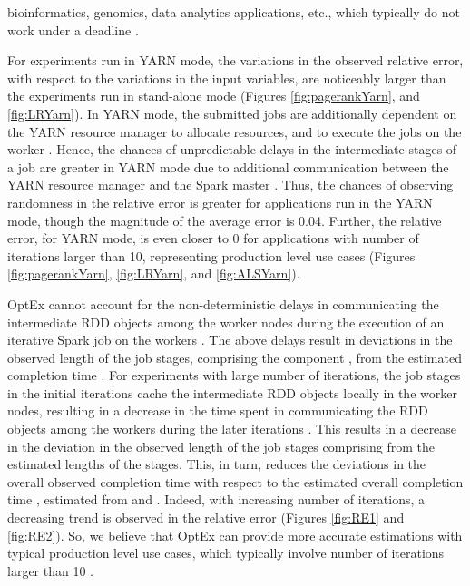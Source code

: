 \documentclass[conference]{IEEEtran}
\begin{document}
  bioinformatics, genomics, data analytics applications, etc., which typically do not work under a deadline \cite{spark:usecase9012}.
\par For experiments run in YARN mode, the variations in the observed relative error, with respect to the variations in the input variables, are noticeably larger than the experiments run in stand-alone mode (Figures \ref{fig:pagerankYarn}, and \ref{fig:LRYarn}). In YARN mode, the submitted jobs are additionally dependent on the YARN resource manager to allocate resources, and to execute the jobs on the worker \cite{HadoopYARN}. Hence, the chances of unpredictable delays in the intermediate stages of a job are greater in YARN mode due to additional communication between the YARN resource manager and the Spark master \cite{HadoopYARN}. Thus, the chances of observing randomness in the relative error is greater for applications run in the YARN mode, though the magnitude of the average error is 0.04. Further, the relative error, for YARN mode, is even closer to 0 for  applications with number of iterations larger than 10, representing production level use cases \cite{spark:usecase1234, spark:usecase5678} (Figures \ref{fig:pagerankYarn}, \ref{fig:LRYarn}, and \ref{fig:ALSYarn}).
\par OptEx cannot account for the non-deterministic delays in communicating the intermediate RDD objects among the worker nodes during the execution of an iterative Spark job on the workers \cite{Zaharia:2012:RDD:2228298.2228301}. The above delays result in deviations in the observed length of the job stages, comprising the component , from the estimated completion time \cite{Zaharia:2012:RDD:2228298.2228301}. For experiments with large number of iterations, the job stages in the initial iterations cache the intermediate RDD objects locally in the worker nodes, resulting in a decrease in the time spent in communicating the RDD objects among the workers during the later iterations \cite{Zaharia:2012:RDD:2228298.2228301}.  This results in a decrease in the deviation in the observed length of the job stages comprising  from the estimated lengths of the stages. This, in turn, reduces the deviations in the overall observed completion time  with respect to the estimated overall completion time , estimated from  and . Indeed, with increasing number of iterations, a decreasing trend
  is observed in the relative error (Figures \ref{fig:RE1} and \ref{fig:RE2}). So, we believe that OptEx can provide more accurate estimations with typical production level use cases, which typically involve number of iterations larger than 10 \cite{spark:usecase1234, spark:usecase5678}.
\end{document}
